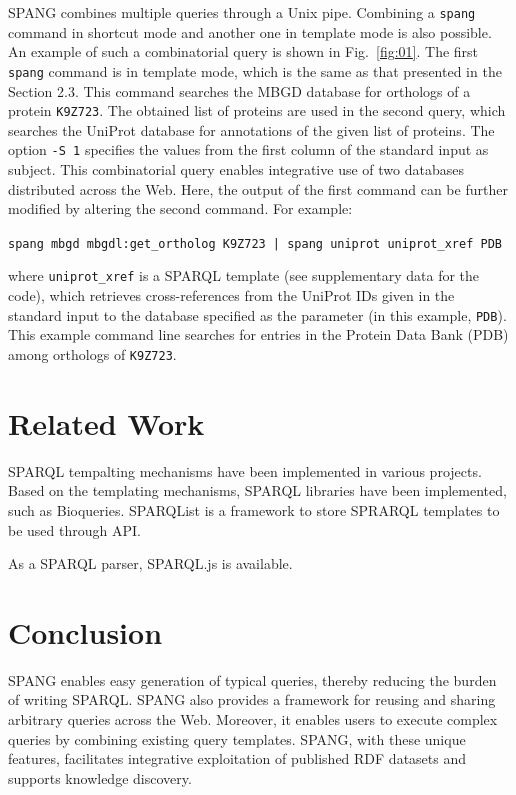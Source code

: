 \documentclass[runningheads]{llncs}
\begin{document}
SPANG combines multiple queries through a Unix pipe. 
Combining a {\tt spang} command in shortcut mode and another one in template mode is also possible.
An example of such a combinatorial query is shown in Fig.~\ref{fig:01}.
The first {\tt spang} command is in template mode, which is the same as that presented in the Section 2.3. 
This command searches the MBGD database for orthologs of a protein {\tt K9Z723}. 
The obtained list of proteins are used in the second query, which searches the UniProt database for annotations of the given list of proteins. 
The option \texttt{-S 1} specifies the values from the first column of the standard input as subject.
This combinatorial query enables integrative use of two databases distributed across the Web. 
Here, the output of the first command can be further modified by altering the second command.
For example:
\begin{quoting}
\texttt{spang mbgd mbgdl:get\_ortholog K9Z723 | spang uniprot uniprot\_xref PDB}
\vspace{1pt}
\end{quoting}
where {\tt uniprot\_xref} is a SPARQL template (see supplementary data for the code), which retrieves cross-references from the UniProt IDs given in the standard input to the database specified as the parameter (in this example, {\tt PDB}). This example command line searches for entries in the Protein Data Bank (PDB) \citep{Berman} among orthologs of {\tt K9Z723}.



\section{Related Work}

SPARQL tempalting mechanisms have been implemented in various projects. Based on the templating mechanisms, SPARQL libraries have been implemented, such as Bioqueries. SPARQList is a framework to store SPRARQL templates to be used through API.

As a SPARQL parser, SPARQL.js is available.


\section{Conclusion}
SPANG enables easy generation of typical queries, thereby reducing the burden of writing SPARQL. SPANG also provides a framework for reusing and sharing arbitrary queries across the Web. Moreover, it enables users to execute complex queries by combining existing query templates. SPANG, with these unique features, facilitates integrative exploitation of published RDF datasets and supports knowledge discovery. 
\end{document}
